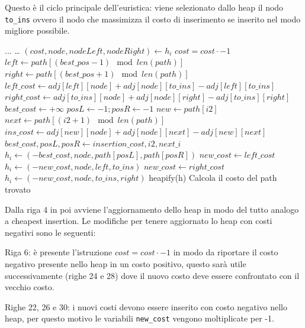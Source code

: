 \documentclass[a4paper,12pt]{report}
\begin{document}
Questo è il ciclo principale dell'euristica: viene selezionato dallo heap il nodo \lstinline!to_ins! ovvero il nodo che massimizza il costo di inserimento se inserito nel modo migliore possibile.
\begin{tcolorbox}[colframe=black, colback=white, boxrule=0.5pt, title=Furthest Insertion Versione 2, coltitle=black, fonttitle=\bfseries, colbacktitle=white, breakable]
  \begin{algorithmic}[1]
    \State ...
      \State \dots
        \State $(cost, node, nodeLeft, nodeRight) \gets h_i$
        \State $cost = cost \cdot -1$
        \State $left \gets path[(best\_pos - 1) \mod len(path)]$
        \State $right \gets path[(best\_pos + 1) \mod len(path)]$
        \State $left\_cost \gets adj[left][node] + adj[node][to\_ins] - adj[left][to\_ins]$
        \State $right\_cost \gets adj[to\_ins][node] + adj[node][right] - adj[to\_ins][right]$
          \State $best\_cost \gets +\infty$
          \State $posL \gets -1; posR \gets -1$
            \State $new \gets path[i2]$
            \State $next \gets path[(i2 + 1) \mod len(path)]$
            \State $ins\_cost \gets adj[new][node] + adj[node][next] - adj[new][next]$
              \State $best\_cost, posL, posR \gets insertion\_cost, i2, next\_i$
            \EndIf
          \EndFor
          \State $h_i \gets (-best\_cost, node, path[posL], path[posR])$
        \EndIf
          \State $new\_cost \gets left\_cost$
          \State $h_i \gets (-new\_cost, node, left, to\_ins)$
        \EndIf
          \State $new\_cost \gets right\_cost$
          \State $h_i \gets (-new\_cost, node, to\_ins, right)$
        \EndIf
      \EndFor
      \State heapify(h)
    \EndWhile
    \State Calcola il costo del path trovato
  \end{algorithmic}
\end{tcolorbox}
Dalla riga 4 in poi avviene l'aggiornamento dello heap in modo del tutto analogo a cheapest insertion. Le modifiche per tenere aggiornato lo heap con costi negativi sono le seguenti:
\begin{legal}
  \item Riga 6: è presente l'istruzione $cost = cost \cdot -1$ in modo da riportare il costo negativo presente nello heap in un costo positivo, questo sarà utile successivamente (righe 24 e 28) dove il nuovo costo deve essere confrontato con il vecchio costo.
  \item Righe 22, 26 e 30: i nuovi costi devono essere inserito con costo negativo nello heap, per questo motivo le variabili \lstinline!new_cost! vengono moltiplicate per -1.
\end{legal}
\end{document}
